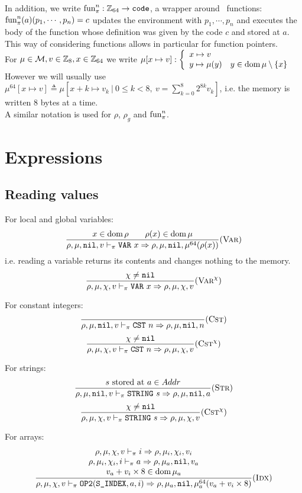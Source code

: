In addition, we write \(\text{fun}_\pi^n: \mathbb{Z}_{64}\to \texttt{code}\), a wrapper around \Cmp\ functions: \(\text{fun}_\pi^n(a)(p_1, \cdots, p_n) = c\) updates the environment with \(p_1, \cdots, p_n\) and executes the body of the function whose definition was given by the code \(c\) and stored at \(a\). This way of considering functions allows in particular for function pointers.\\

For \(\mu\in\mathcal{M}, v\in\mathbb{Z}_{8}, x\in\mathbb{Z}_{64}\) we write \(\mu[x\mapsto v]: \left\{\begin{array}{ll}x\mapsto v & \\ y\mapsto \mu(y) & y\in \operatorname{dom}\mu\setminus\{x\}\end{array}\right.\)\\
However we will usually use \(\mu^{64}[x\mapsto v] \triangleq\mu[x+k\mapsto v_k\ |\  0\leq k<8,\ v = \sum_{k=0}^8 2^{8k}v_k]\), i.e. the memory is written 8 bytes at a time.\\

A similar notation is used for \(\rho\), \(\rho_g\) and \(\text{fun}_\pi^n\).

\section{Expressions}
\subsection{Reading values}
For local and global variables:
\[\dfrac{x\in\operatorname{dom}\rho \qquad \rho(x)\in\operatorname{dom}\mu}{\rho,\mu,\texttt{nil},v \vdash_\pi \texttt{VAR}\ x\Rightarrow \rho,\mu,\texttt{nil},\mu^{64}(\rho(x))}(\textsc{Var})\]
i.e. reading a variable returns its contents and changes nothing to the memory.\\
\[\dfrac{\chi\ne\texttt{nil}}{\rho,\mu,\chi,v \vdash_\pi \texttt{VAR}\ x\Rightarrow \rho,\mu,\chi,v} (\textsc{Var}^\chi)\]

For constant integers:
\[\dfrac{}{\rho,\mu,\texttt{nil},v \vdash_\pi \texttt{CST}\ n\Rightarrow \rho,\mu,\texttt{nil},n}(\textsc{Cst})\]
\[\dfrac{\chi\ne\texttt{nil}}{\rho,\mu,\chi,v \vdash_\pi \texttt{CST}\ n\Rightarrow \rho,\mu,\chi,v} (\textsc{Cst}^\chi)\]

For strings:
\[\dfrac{s\text{ stored at }a\in Addr}{\rho,\mu,\texttt{nil},v \vdash_\pi \texttt{STRING}\ s\Rightarrow \rho,\mu,\texttt{nil},a}(\textsc{Str})\]
\[\dfrac{\chi\ne\texttt{nil}}{\rho,\mu,\chi,v \vdash_\pi \texttt{STRING}\ s\Rightarrow \rho,\mu,\chi,v} (\textsc{Cst}^\chi)\]

For arrays:
\[\dfrac{\begin{array}{c}
    \rho,\mu,\chi,v \vdash_\pi i\Rightarrow \rho,\mu_i,\chi_i,v_i \\
    \rho,\mu_i,\chi_i,i \vdash_\pi a\Rightarrow \rho,\mu_a,\texttt{nil},v_a \\
    v_a+v_i\times 8\in\operatorname{dom}\mu_a
\end{array}}{\rho,\mu,\chi,v \vdash_\pi \texttt{OP2}(\texttt{S\_INDEX}, a, i) \Rightarrow \rho,\mu_a,\texttt{nil},\mu_a^{64}(v_a+v_i\times 8)}(\textsc{Idx})\]

